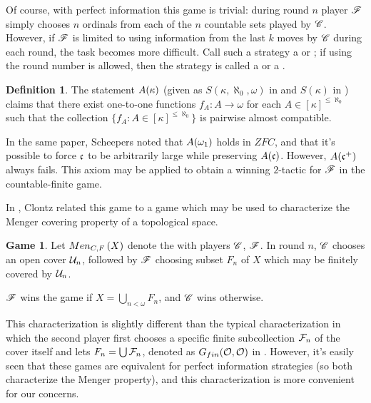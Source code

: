 \documentclass{amsart}
\theoremstyle{plain}
\theoremstyle{definition}
\newtheorem{definition}[theorem]{Definition}
\newtheorem{game}[theorem]{Game}
\theoremstyle{remark}
\theoremstyle{plain}
\theoremstyle{definition}
\theoremstyle{remark}
\begin{document}
  Of course, with perfect information this game is trivial: during round
  \(n\) player \(\mathscr{F}\) simply chooses \(n\) ordinals from each of the
  \(n\) countable sets played by \(\mathscr{C}\). However, if \(\mathscr{F}\) is limited
  to using information from the last \(k\) moves by \(\mathscr{C}\) during each
  round, the task becomes more difficult. Call such a strategy a
   or ; if using the round
  number is allowed, then the strategy is called a 
  or a .

  \begin{definition}
    The statement \(A(\kappa)\) (given as \(S(\kappa,\aleph_0,\omega)\)
    in \cite{MR1129143} and \(S(\kappa)\) in \cite{clontzMengerGamePreprint})
    claims that there exist one-to-one functions
    \(f_A:A\to\omega\) for each \(A\in[\kappa]^{\leq\aleph_0}\) such that
    the collection \(\{f_A:A\in[\kappa]^{\leq\aleph_0}\}\) is pairwise
    almost compatible.
  \end{definition}

  In the same paper, Scheepers noted that \(A(\omega_1)\) holds in \(ZFC\),
  and that it's possible to force \(\mathfrak{c}\) to be arbitrarily large
  while preserving \(A(\mathfrak{c})\). However, \(A(\mathfrak{c}^+)\) always fails.
  This axiom may be applied to obtain a winning \(2\)-tactic for \(\mathscr{F}\)
  in the countable-finite game.

  In \cite{clontzMengerGamePreprint}, Clontz related this game to a game
  which may be used to characterize the Menger covering property of a
  topological space.

  \begin{game}
    Let \(Men_{C,F}\left({X}\right)\) denote the  with players \(\mathscr{C}\),
    \(\mathscr{F}\).
    In round \(n\), \(\mathscr{C}\) chooses an open cover \(\mathcal{U}_n\), followed by
    \(\mathscr{F}\)
    choosing subset \(F_n\) of \(X\) which may be finitely covered by \(\mathcal{U}_n\).

    \(\mathscr{F}\) wins the game if \(X = \bigcup_{n<\omega}F_n\),
    and \(\mathscr{C}\) wins otherwise.
  \end{game}

  This characterization is slightly different than the typical characterization
  in which the second player first chooses a specific
  finite subcollection \(\mathcal{F}_n\) of the cover itself and lets
  \(F_n=\bigcup \mathcal{F}_n\), denoted as \(G_{fin}(\mathcal{O},\mathcal{O})\)
  in \cite{MR1378387}.
  However, it's easily seen that these games are equivalent
  for perfect information strategies (so both characterize
  the Menger property), and this characterization is
  more convenient for our concerns.
\end{document}
